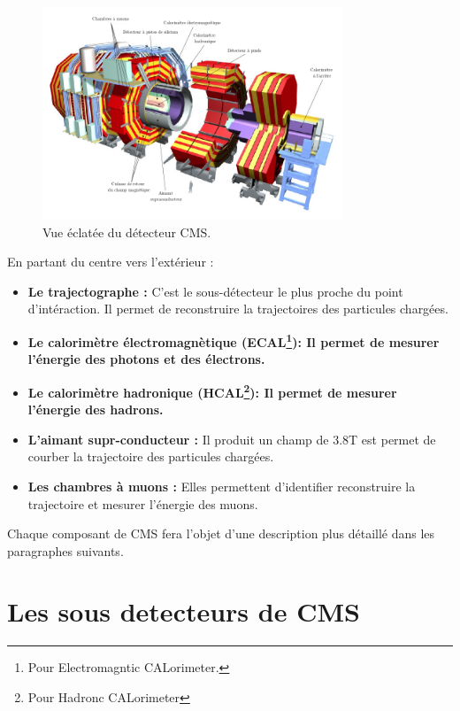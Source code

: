 \begin{figure}
	\centering
	\includegraphics[width=0.80\textwidth]{CMS/cms.png}
	\caption{\label{cmsexploded}Vue éclatée du détecteur CMS.}
\end{figure}
\newpage
En partant du centre vers l'extérieur :
\begin{itemize}[label=$\bullet$]
	\item \textbf{Le trajectographe : } C'est le sous-détecteur le plus proche du point d'intéraction. Il permet de reconstruire la trajectoires des particules chargées.
	 \item \textbf{Le calorimètre électromagnètique (ECAL\footnote{Pour Electromagntic CALorimeter.}): Il permet de mesurer l'énergie des photons et des électrons.}
	 \item \textbf{Le calorimètre hadronique (HCAL\footnote{Pour Hadronc CALorimeter}): Il permet de mesurer l'énergie des hadrons.}
	 \item \textbf{L'aimant supr-conducteur : } Il produit un champ de 3.8T est permet de courber la trajectoire des particules chargées.
	 \item \textbf{Les chambres à muons : } Elles permettent d'identifier reconstruire la trajectoire et mesurer l'énergie des muons. 
\end{itemize}
Chaque composant de CMS fera l'objet d'une description plus détaillé dans les paragraphes suivants.

\section{Les sous detecteurs de CMS}
